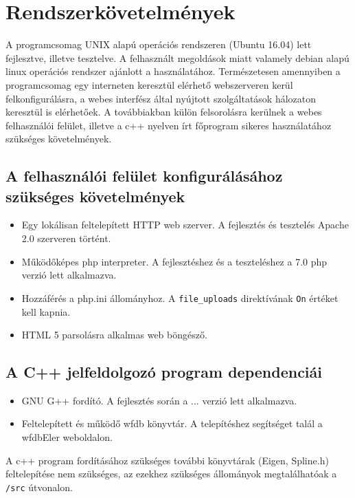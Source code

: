 \documentclass[oneside,titlepage,12pt,a4paper]{report}
\begin{document}
\section{Rendszerkövetelmények}

A programcsomag UNIX alapú operációs rendszeren (Ubuntu 16.04) lett fejlesztve, illetve tesztelve. A felhasznált megoldások miatt valamely debian alapú linux operációs rendszer ajánlott a használatához. Természetesen amennyiben a programcsomag egy interneten keresztül elérhető webszerveren kerül felkonfigurálásra, a webes interfész által nyújtott szolgáltatások hálozaton keresztül is elérhetőek. A továbbiakban külön felsorolásra kerülnek a webes felhasználói felület, illetve a c++ nyelven írt főprogram sikeres használatához szükséges követelmények.

\subsection*{A felhasználói felület konfigurálásához szükséges követelmények}

\begin{itemize}
\item Egy lokálisan feltelepített HTTP web szerver. A fejlesztés és tesztelés Apache 2.0 szerveren történt.
\item Működőképes php interpreter. A fejlesztéshez és a teszteléshez a 7.0 php verzió lett alkalmazva. 
\item Hozzáférés a php.ini állományhoz. A \texttt{file\_uploads} direktívának \texttt{On} értéket kell kapnia.
\item HTML 5 parsolásra alkalmas web böngésző. 
\end{itemize}

\subsection*{A C++ jelfeldolgozó program dependenciái}

\begin{itemize}
\item GNU G++ fordító. A fejlesztés során a ... verzió lett alkalmazva.
\item Feltelepített és működő wfdb könyvtár. A telepítéshez segítséget talál a {wfdbEler} weboldalon.
\end{itemize}

\noindent A c++ program fordításához szükséges további könyvtárak (Eigen, Spline.h) feltelepítése nem szükséges, az ezekhez szükséges állományok megtalálhatóak a \texttt{/src} útvonalon.
\end{document}
